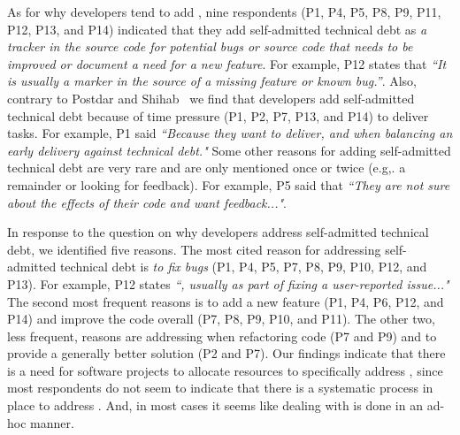 As for why developers tend to add \SATD, nine respondents (P1, P4, P5, P8, P9, P11, P12, P13, and P14) indicated that they add self-admitted technical debt as \emph{a tracker in the source code for potential bugs or source code that needs to be improved or document a need for a new feature}. For example, P12 states that \textit{``It is usually a marker in the source of a missing feature or known bug.''}. Also, contrary to Postdar and Shihab~\cite{Potdar2014ICSME} we find that developers add self-admitted technical debt because of time pressure (P1, P2, P7, P13, and P14) to deliver tasks. For example, P1 said \textit{``Because they want to deliver, and when balancing an early delivery against technical debt."} Some other reasons for adding self-admitted technical debt are very rare and are only mentioned once or twice (e.g,. a remainder or looking for feedback). For example, P5 said that \textit{``They are not sure about the effects of their code and want feedback..."}.

In response to the question on why developers address self-admitted technical debt, we identified five reasons. The most cited reason for addressing self-admitted technical debt is \emph{to fix bugs} (P1, P4, P5, P7, P8, P9, P10, P12, and P13). For example, P12 states \textit{``, usually as part of fixing a user-reported issue..."} The second most frequent reasons is to add a new feature (P1, P4, P6, P12, and P14) and improve the code overall (P7, P8, P9, P10, and P11). The other two, less frequent, reasons are addressing \SATD when refactoring code (P7 and P9) and to provide a generally better solution (P2 and P7). Our findings indicate that there is a need for software projects to allocate resources to specifically address \SATD, since most respondents do not seem to indicate that there is a systematic process in place to address \SATD. And, in most cases it seems like dealing with \SATD is done in an ad-hoc manner.



 

 
 
 